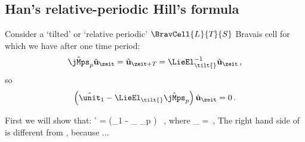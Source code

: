 \subsection{Han's relative-periodic Hill's formula}
\label{sect:catlattHillRelativeHan}

Consider a `tilted' or `relative periodic'
$\BravCell{\speriod{}}{\period{}}{S}$ Bravais cell for which we have
after one time period:
\[
\hat{\mathbf{\jMps}}_p \hat{\mathbf{u}}_\zeit
= \hat{\mathbf{u}}_{\zeit+\period{}}
=
\mathbf{\LieEl}_\tilt{}^{-1} \hat{\mathbf{u}}_\zeit
 \,,
\]
so
\[
    \left(
\hat{\unit}_{1} - \mathbf{\LieEl}_\tilt{}\hat{\mathbf{\jMps}}_p
    \right)\hat{\mathbf{u}}_\zeit = 0
\,.
\]


First we will show that:
\bea
\det \hat{\mathbf{\jMorb}}' = \det \left(\hat{\unit}_{1}
   - \mathbf{\LieEl}_\tilt{} \hat{\mathbf{\jMps}}_p \right) \, ,
\label{RelativeHill}
\eea
where
\beq
\mathbf{\LieEl}_\tilt{} =
\,,
The right hand side of  is different from
, because ...

